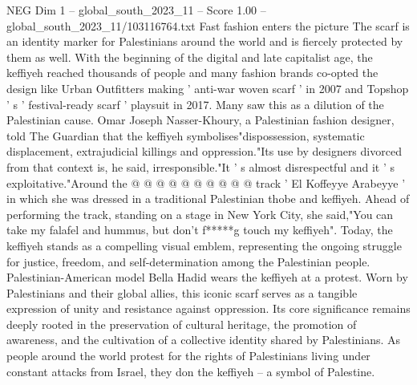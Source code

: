 \begin{textsample}{NEG Dim 1 – global\_south\_2023\_11 – Score 1.00 – global\_south\_2023\_11/103116764.txt}
Fast fashion enters the picture The scarf is an identity marker for Palestinians around the world and is fiercely protected by them as well.
With the beginning of the digital and late capitalist age, the keffiyeh reached thousands of people and many fashion brands co-opted the design like Urban Outfitters making ' anti-war woven scarf ' in 2007 and Topshop ' s ' festival-ready scarf ' playsuit in 2017.
Many saw this as a dilution of the Palestinian cause.
Omar Joseph Nasser-Khoury, a Palestinian fashion designer, told The Guardian that the keffiyeh symbolises"dispossession, systematic displacement, extrajudicial killings and oppression."Its use by designers divorced from that context is, he said, irresponsible."It ' s almost disrespectful and it ' s exploitative."Around the @ @ @ @ @ @ @ @ @ @ track ' El Koffeyye Arabeyye ' in which she was dressed in a traditional Palestinian thobe and keffiyeh.
Ahead of performing the track, standing on a stage in New York City, she said,"You can take my falafel and hummus, but don't f*****g touch my keffiyeh".
Today, the keffiyeh stands as a compelling visual emblem, representing the ongoing struggle for justice, freedom, and self-determination among the Palestinian people.
Palestinian-American model Bella Hadid wears the keffiyeh at a protest.
Worn by Palestinians and their global allies, this iconic scarf serves as a tangible expression of unity and resistance against oppression.
Its core significance remains deeply rooted in the preservation of cultural heritage, the promotion of awareness, and the cultivation of a collective identity shared by Palestinians.
As people around the world protest for the rights of Palestinians living under constant attacks from Israel, they don the keffiyeh -- a symbol of Palestine.

\end{textsample}
